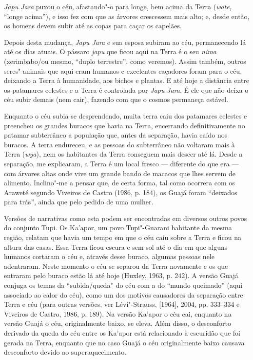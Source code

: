 \emph{Japu Jara} puxou o céu, afastando"-o para longe, bem acima da Terra
(\emph{wate}, ``longe acima''), e isso fez com que as árvores crescessem
mais alto; e, desde então, os homens devem subir até as copas para caçar
os capelães.

Depois desta mudança, \emph{Japu Jara} e sua esposa subiram ao céu,
permanecendo lá até os dias atuais. O pássaro \emph{japu} que ficou aqui
na Terra é o seu \emph{nima} (xerimbabo/ou mesmo, ``duplo terrestre'',
como veremos). Assim também, outros seres"-animais que aqui eram humanos
e excelentes caçadores foram para o céu, deixando a Terra à humanidade,
aos bichos e plantas. E até hoje a distância entre os patamares celestes
e a Terra é controlada por \emph{Japu} \emph{Jara}. É ele que não deixa
o céu subir demais (nem cair), fazendo com que o cosmos permaneça
estável.

Enquanto o céu subia se desprendendo, muita terra caiu dos patamares
celestes e preencheu os grandes buracos que havia na Terra, encerrando
definitivamente no patamar subterrâneo a população que, antes da
separação, havia caído nos buracos. A terra endureceu, e as pessoas do
subterrâneo não voltaram mais à Terra (\emph{wya}), nem os habitantes da
Terra conseguem mais descer até lá. Desde a separação, me explicaram, a
Terra é um local fresco --- diferente do que era --- com árvores altas onde
vive um grande bando de macacos que lhes servem de alimento. Inclino"-me
a pensar que, de certa forma, tal como ocorrera com os Araweté segundo
Viveiros de Castro (1986, p. 184), os Guajá foram ``deixados para
trás'', ainda que pelo pedido de uma mulher.

Versões de narrativas como esta podem ser encontradas em diversos outros
povos do conjunto Tupi. Os Ka'apor, um povo Tupi"-Guarani habitante da
mesma região, relatam que havia um tempo em que o céu caiu sobre a Terra
e ficou na altura das casas. Essa Terra ficou escura e sem sol até o dia
em que alguns humanos cortaram o céu e, através desse buraco, algumas
pessoas nele adentraram. Neste momento o céu se separou da Terra
novamente e os que entraram pelo buraco estão lá até hoje (Huxley, 1963,
p. 242). A versão Guajá conjuga os temas da ``subida/queda'' do céu com a
do ``mundo queimado'' (aqui associado ao calor do céu), como um dos
motivos causadores da separação entre Terra e céu (para outras versões,
ver Lévi"-Strauss, {[}1964{]}, 2004, pp. 333--334 e Viveiros de Castro,
1986, p. 189). Na versão Ka'apor o céu cai, enquanto na versão Guajá o
céu, originalmente baixo, se eleva. Além disso, o desconforto derivado
da queda do céu entre os Ka'apor está relacionado à escuridão que foi
gerada na Terra, enquanto que no caso Guajá o céu originalmente baixo
causava desconforto devido ao superaquecimento.

